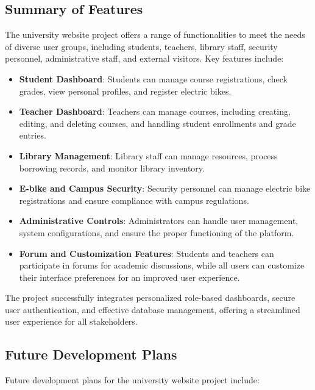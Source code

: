 \documentclass[12pt]{article}
\begin{document}
\subsection{Summary of Features}
The university website project offers a range of functionalities to meet the needs of diverse user groups, including students, teachers, library staff, security personnel, administrative staff, and external visitors. Key features include:

\begin{itemize}
    \item \textbf{Student Dashboard}: Students can manage course registrations, check grades, view personal profiles, and register electric bikes.
    \item \textbf{Teacher Dashboard}: Teachers can manage courses, including creating, editing, and deleting courses, and handling student enrollments and grade entries.
    \item \textbf{Library Management}: Library staff can manage resources, process borrowing records, and monitor library inventory.
    \item \textbf{E-bike and Campus Security}: Security personnel can manage electric bike registrations and ensure compliance with campus regulations.
    \item \textbf{Administrative Controls}: Administrators can handle user management, system configurations, and ensure the proper functioning of the platform.
    \item \textbf{Forum and Customization Features}: Students and teachers can participate in forums for academic discussions, while all users can customize their interface preferences for an improved user experience.
\end{itemize}
The project successfully integrates personalized role-based dashboards, secure user authentication, and effective database management, offering a streamlined user experience for all stakeholders.

\subsection{Future Development Plans}
Future development plans for the university website project include:
\end{document}
